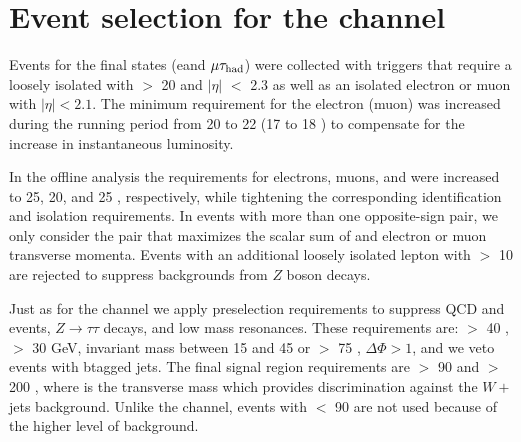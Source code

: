 \section{\texorpdfstring{Event selection for the \leptonTau channel}{Event selection for the lepton-tau channel}}
\label{sect:eleTauCuts}
Events for the \leptonTau final states (e\Tau and $\mu\tau_{\rm had}$)
were collected with triggers that require 
a loosely isolated \Tau with \PT $>$ 20 \GeV and $|\eta|$ $<$ 2.3 as well as
an isolated electron or muon with $|\eta| < 2.1$.  The minimum
\PT requirement for the electron (muon) was increased during the running
period from 20 to 22 \GeV (17 to 18 \GeV)
to compensate for the increase in instantaneous luminosity.

In the offline analysis the \PT requirements for electrons, muons, and \Tau were increased to 25, 20, and 25 \GeV, respectively, while tightening the corresponding identification and isolation requirements.
In events with more than one opposite-sign \leptonTau pair, we only consider
 the pair that maximizes the scalar sum of \Tau and electron or muon 
transverse momenta.  Events with an additional loosely isolated lepton
with \PT $>$ 10 \GeV are rejected to suppress backgrounds from $Z$ boson
decays.  

Just as for the \Tau\Tau channel we apply preselection requirements to suppress
QCD and \ttbar events, $Z \to \tau \tau$ decays, and low mass resonances.
These requirements are: \mttwo $>$ 40 \GeV, \MET $>$ 30 GeV, \leptonTau 
invariant mass between 15 and 45 \GeV or $>$ 75 \GeV, $\Delta \Phi > 1$, and we veto events with btagged jets.
The final signal region requirements are \mttwo $>$ 90 \GeV and 
\tauMT $>$ 200 \GeV, where \tauMT is the \Tau transverse mass which provides
discrimination against the $W+$jets background.  Unlike the \tauTau channel,
events with \mttwo $<$ 90 \GeV are not used because of the higher 
level of background.




